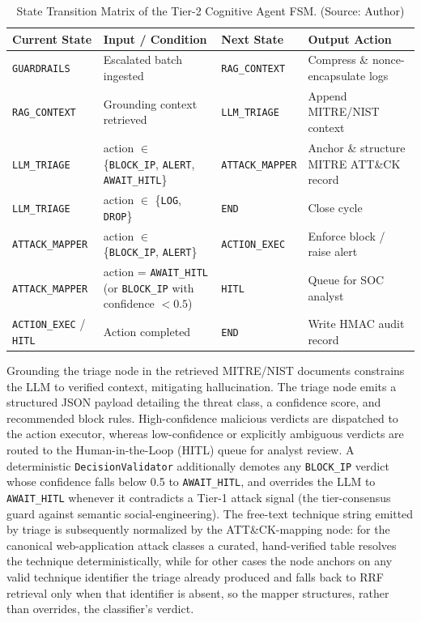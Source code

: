 \begin{table}[!htbp]
    \centering
    \caption{State Transition Matrix of the Tier-2 Cognitive Agent FSM. (Source: Author)}
    \label{tab:agent_fsm_transitions}
    \begin{tabular}{|>{\raggedright\arraybackslash}p{}|>{\raggedright\arraybackslash}p{}|>{\raggedright\arraybackslash}p{}|>{\raggedright\arraybackslash}p{}|}
        \hline
        \textbf{Current State} & \textbf{Input / Condition} & \textbf{Next State} & \textbf{Output Action} \\
        \hline
        \texttt{GUARDRAILS} & Escalated batch ingested & \texttt{RAG\_CONTEXT} & Compress \& nonce-encapsulate logs \\
        \hline
        \texttt{RAG\_CONTEXT} & Grounding context retrieved & \texttt{LLM\_TRIAGE} & Append MITRE\slash NIST context \\
        \hline
        \texttt{LLM\_TRIAGE} & action $\in$ \{\texttt{BLOCK\_IP}, \texttt{ALERT}, \texttt{AWAIT\_HITL}\} & \texttt{ATTACK\_MAPPER} & Anchor \& structure MITRE ATT\&CK record \\
        \hline
        \texttt{LLM\_TRIAGE} & action $\in$ \{\texttt{LOG}, \texttt{DROP}\} & \texttt{END} & Close cycle \\
        \hline
        \texttt{ATTACK\_MAPPER} & action $\in$ \{\texttt{BLOCK\_IP}, \texttt{ALERT}\} & \texttt{ACTION\_EXEC} & Enforce block / raise alert \\
        \hline
        \texttt{ATTACK\_MAPPER} & action = \texttt{AWAIT\_HITL} (or \texttt{BLOCK\_IP} with confidence $<0.5$) & \texttt{HITL} & Queue for SOC analyst \\
        \hline
        \texttt{ACTION\_EXEC} / \texttt{HITL} & Action completed & \texttt{END} & Write HMAC audit record \\
        \hline
    \end{tabular}
\end{table}

Grounding the triage node in the retrieved MITRE/NIST documents constrains the LLM to verified context, mitigating hallucination. The triage node emits a structured JSON payload detailing the threat class, a confidence score, and recommended block rules. High-confidence malicious verdicts are dispatched to the action executor, whereas low-confidence or explicitly ambiguous verdicts are routed to the Human-in-the-Loop (HITL) queue for analyst review. A deterministic \texttt{DecisionValidator} additionally demotes any \texttt{BLOCK\_IP} verdict whose confidence falls below 0.5 to \texttt{AWAIT\_HITL}, and overrides the LLM to \texttt{AWAIT\_HITL} whenever it contradicts a Tier-1 attack signal (the tier-consensus guard against semantic social-engineering). The free-text technique string emitted by triage is subsequently normalized by the ATT\&CK-mapping node: for the canonical web-application attack classes a curated, hand-verified table resolves the technique deterministically, while for other cases the node anchors on any valid technique identifier the triage already produced and falls back to RRF retrieval only when that identifier is absent, so the mapper structures, rather than overrides, the classifier's verdict.

